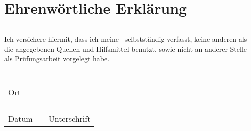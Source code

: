 \section*{Ehrenwörtliche Erklärung}

\begin{verbatim}

\end{verbatim}

Ich versichere hiermit, dass ich meine \Dokumentenart \ selbstständig verfasst, keine anderen als die angegebenen Quellen und Hilfsmittel benutzt, sowie nicht an anderer Stelle als Prüfungsarbeit vorgelegt habe.

\begin{verbatim}

\end{verbatim}

\begin{table*}[hp]
\centering
\begin{tabular}{ L{6cm} L{2cm} L{6cm}}
& & \\
& & \\ 
Ort &  \\
& & \\
& & \\
& & \\
& &  \\  
Datum & & Unterschrift \\
\end{tabular}
\end{table*}